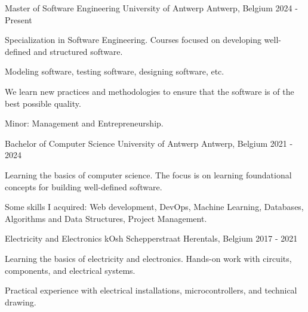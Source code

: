 
\begin{cventries}

  \cventry
    {Master of Software Engineering} %
    {University of Antwerp} %
    {Antwerp, Belgium} %
    {2024 - Present} %
    {
      \begin{cvitems} %
        \item {Specialization in Software Engineering. Courses focused on developing well-defined and structured software.}
        \item {Modeling software, testing software, designing software, etc.}
        \item {We learn new practices and methodologies to ensure that the software is of the best possible quality.}
        \item {Minor: Management and Entrepreneurship.}
      \end{cvitems}
    }

  \cventry
    {Bachelor of Computer Science} %
    {University of Antwerp} %
    {Antwerp, Belgium} %
    {2021 - 2024} %
    {
      \begin{cvitems} %
        \item {Learning the basics of computer science. The focus is on learning foundational concepts for building well-defined software.}
        \item {Some skills I acquired: Web development, DevOps, Machine Learning, Databases, Algorithms and Data Structures, Project Management.}
      \end{cvitems}
    }

  \cventry
    {Electricity and Electronics} %
    {kOsh Schepperstraat} %
    {Herentals, Belgium} %
    {2017 - 2021} %
    {
      \begin{cvitems} %
        \item {Learning the basics of electricity and electronics. Hands-on work with circuits, components, and electrical systems.}
        \item {Practical experience with electrical installations, microcontrollers, and technical drawing.}
      \end{cvitems}
    }

\end{cventries}
